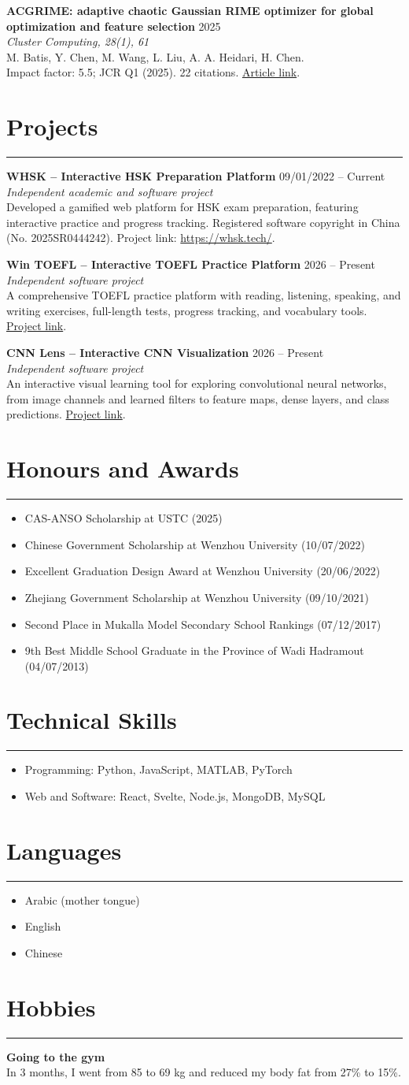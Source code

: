 \documentclass[11pt,a4paper]{article}
\newcommand{\cvsection}[1]{
  \section*{#1}
  \vspace{-0.6em}
  \hrule
  \vspace{0.6em}
}
\newcommand{\cventry}[4]{
  \begin{minipage}{\linewidth}
  \textbf{#1} \hfill #2 \\
  \emph{#3} \\
  #4
  \end{minipage}
  \par
  \vspace{0.45em}
}
\begin{document}
\cventry
  {ACGRIME: adaptive chaotic Gaussian RIME optimizer for global optimization and feature selection}
  {2025}
  {Cluster Computing, 28(1), 61}
  {M. Batis, Y. Chen, M. Wang, L. Liu, A. A. Heidari, H. Chen.\\
  Impact factor: 5.5; JCR Q1 (2025). 22 citations. \href{https://link.springer.com/article/10.1007/s10586-024-04716-9}{Article link}.}

\newpage
\cvsection{Projects}
\cventry
  {WHSK -- Interactive HSK Preparation Platform}
  {09/01/2022 -- Current}
  {Independent academic and software project}
  {Developed a gamified web platform for HSK exam preparation, featuring interactive practice and progress tracking. Registered software copyright in China (No. 2025SR0444242). Project link: \href{https://whsk.tech/}{https://whsk.tech/}.}

\cventry
  {Win TOEFL -- Interactive TOEFL Practice Platform}
  {2026 -- Present}
  {Independent software project}
  {A comprehensive TOEFL practice platform with reading, listening, speaking, and writing exercises, full-length tests, progress tracking, and vocabulary tools. \href{https://wintoefl.vercel.app/reading}{Project link}.}

\cventry
  {CNN Lens -- Interactive CNN Visualization}
  {2026 -- Present}
  {Independent software project}
  {An interactive visual learning tool for exploring convolutional neural networks, from image channels and learned filters to feature maps, dense layers, and class predictions. \href{https://cnn-lens.vercel.app/}{Project link}.}

\cvsection{Honours and Awards}
\begin{itemize}
  \item CAS-ANSO Scholarship at USTC (2025)
  \item Chinese Government Scholarship at Wenzhou University (10/07/2022)
  \item Excellent Graduation Design Award at Wenzhou University (20/06/2022)
  \item Zhejiang Government Scholarship at Wenzhou University (09/10/2021)
  \item Second Place in Mukalla Model Secondary School Rankings (07/12/2017)
  \item 9th Best Middle School Graduate in the Province of Wadi Hadramout (04/07/2013)
\end{itemize}

\cvsection{Technical Skills}
\begin{itemize}
  \item Programming: Python, JavaScript, MATLAB, PyTorch
  \item Web and Software: React, Svelte, Node.js, MongoDB, MySQL
\end{itemize}

\cvsection{Languages}
\begin{itemize}
  \item Arabic (mother tongue)
  \item English
  \item Chinese
\end{itemize}

\cvsection{Hobbies}
\textbf{Going to the gym}\\
In 3 months, I went from 85 to 69 kg and reduced my body fat from 27\% to 15\%.
\end{document}

